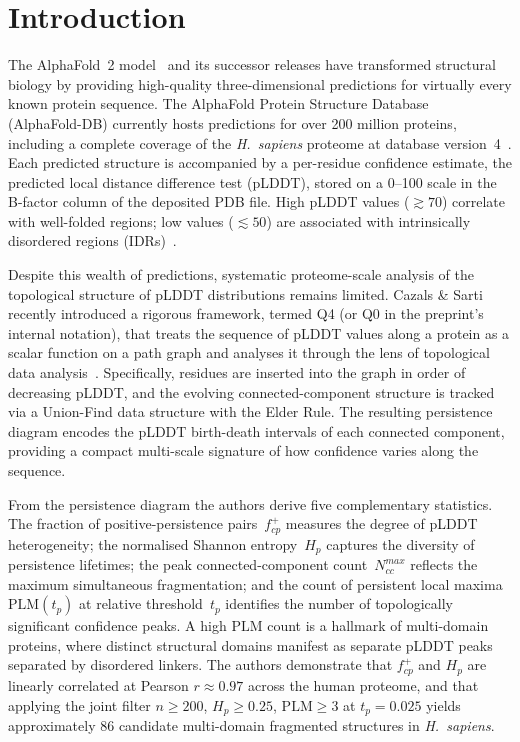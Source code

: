 \section{Introduction}
\label{sec:introduction}

The AlphaFold~2 model~\cite{jumper2021highly} and its successor releases
have transformed structural biology by providing high-quality three-dimensional
predictions for virtually every known protein sequence.
The AlphaFold Protein Structure Database~\cite{varadi2022alphafold}
(AlphaFold-DB) currently hosts predictions for over 200 million proteins,
including a complete coverage of the \textit{H.~sapiens} proteome at
database version~4~\cite{tunyasuvunakool2021highly}.
Each predicted structure is accompanied by a per-residue confidence
estimate, the predicted local distance difference test (pLDDT), stored on
a 0--100 scale in the B-factor column of the deposited PDB file.
High pLDDT values ($\gtrsim70$) correlate with well-folded regions;
low values ($\lesssim50$) are associated with intrinsically disordered
regions (IDRs)~\cite{alderson2023systematic}.

Despite this wealth of predictions, systematic proteome-scale analysis of
the topological structure of pLDDT distributions remains limited.
Cazals \& Sarti~\cite{cazals2025alphafold} recently introduced a
rigorous framework, termed Q4 (or Q0 in the preprint's internal
notation), that treats the sequence of pLDDT values along a protein as a
scalar function on a path graph and analyses it through the lens of
topological data analysis~\cite{edelsbrunner2010computational}.
Specifically, residues are inserted into the graph in order of decreasing
pLDDT, and the evolving connected-component structure is tracked via a
Union-Find data structure with the Elder Rule.
The resulting persistence diagram encodes the pLDDT birth-death intervals
of each connected component, providing a compact multi-scale signature of
how confidence varies along the sequence.

From the persistence diagram the authors derive five complementary
statistics.
The fraction of positive-persistence pairs~$f^+_{cp}$ measures the degree
of pLDDT heterogeneity; the normalised Shannon entropy~$H_p$ captures the
diversity of persistence lifetimes; the peak connected-component
count~$N_{cc}^{max}$ reflects the maximum simultaneous fragmentation; and
the count of persistent local maxima~$\mathrm{PLM}(t_p)$ at relative
threshold~$t_p$ identifies the number of topologically significant
confidence peaks.
A high $\mathrm{PLM}$ count is a hallmark of multi-domain proteins, where
distinct structural domains manifest as separate pLDDT peaks separated by
disordered linkers.
The authors demonstrate that $f^+_{cp}$ and $H_p$ are linearly correlated
at Pearson $r \approx 0.97$ across the human proteome, and that applying
the joint filter $n \ge 200$, $H_p \ge 0.25$, $\mathrm{PLM} \ge 3$ at
$t_p = 0.025$ yields approximately 86 candidate multi-domain fragmented
structures in \textit{H.~sapiens}.

